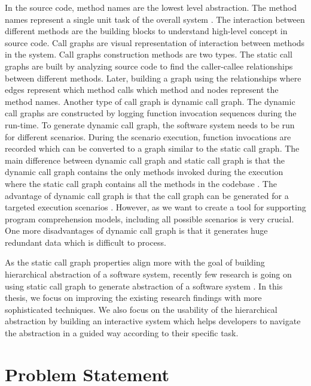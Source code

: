 In the source code, method names are the lowest level abstraction. The method names represent a single unit task of the overall system \cite{de2012using, starke2009searching}. The interaction between different methods are the building blocks to understand high-level concept in source code. Call graphs are visual representation of interaction between methods in the system. Call graphs construction methods are two types. The static call graphs are built by analyzing source code to find the caller-callee relationships between different methods. Later, building a graph using the relationships where edges represent which method calls which method and nodes represent the method names. Another type of call graph is dynamic call graph. The dynamic call graphs are constructed by logging function invocation sequences during the run-time. To generate dynamic call graph, the software system needs to be run for different scenarios. During the scenario execution, function invocations are recorded which can be converted to a graph similar to the static call graph. The main difference between dynamic call graph and static call graph is that the dynamic call graph contains the only methods invoked during the execution where the static call graph contains all the methods in the codebase \cite{gharibi2018automaticStaticCluster}. The advantage of dynamic call graph is that the call graph can be generated for a targeted execution scenarios \cite{feng2018hierarchicalExecutionComprehension}. However, as we want to create a tool for supporting program comprehension models, including all possible scenarios is very crucial. One more disadvantages of dynamic call graph is that it generates huge redundant data which is difficult to process. 

As the static call graph properties align more with the goal of building hierarchical abstraction of a software system, recently few research is going on using static call graph to generate abstraction of a software system \cite{gharibi2018automaticStaticCluster, walunj2019graphevoEvolutionCall}. In this thesis, we focus on improving the existing research findings with more sophisticated techniques. We also focus on the usability of the hierarchical abstraction by building an interactive system which helps developers to navigate the abstraction in a guided way according to their specific task. 

 
\newpage

\section{Problem Statement}

